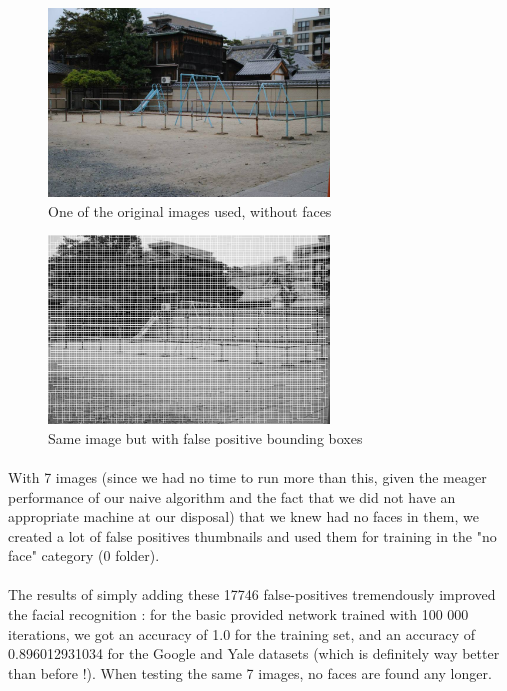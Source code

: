 \documentclass[french]{article}
\begin{document}
\begin{figure}[h]
\includegraphics[height=5cm]{1.jpg}
\centering
\caption{One of the original images used, without faces}
\end{figure}

\begin{figure}[h]
\includegraphics[height=5cm]{1_boxes.jpg}
\centering
\caption{Same image but with false positive bounding boxes}
\end{figure}

\paragraph{} With 7 images (since we had no time to run more than this, given the meager performance of our naive algorithm and the fact that we did not have an appropriate machine at our disposal) that we knew had no faces in them, we created a lot of false positives thumbnails and used them for training in the "no face" category (0 folder).

\paragraph{} The results of simply adding these 17746 false-positives tremendously improved the facial recognition : for the basic provided network trained with 100 000 iterations, we got an accuracy of 1.0 for the training set, and an accuracy of 0.896012931034 for the Google and Yale datasets (which is definitely way better than before !). When testing the same 7 images, no faces are found any longer.
\end{document}
